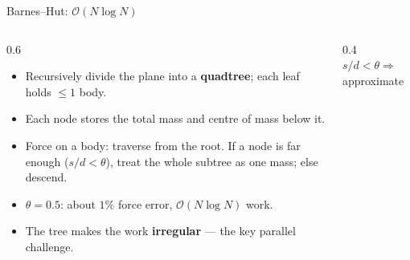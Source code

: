 \documentclass[aspectratio=169]{beamer}
\begin{document}
\begin{frame}{Barnes--Hut: $\mathcal{O}(N\log N)$}
\begin{columns}
\begin{column}{0.6\textwidth}
\begin{itemize}
  \item Recursively divide the plane into a \textbf{quadtree}; each leaf holds
        $\le 1$ body.
  \item Each node stores the total mass and centre of mass below it.
  \item Force on a body: traverse from the root. If a node is far enough
        ($s/d<\theta$), treat the whole subtree as one mass; else descend.
  \item $\theta=0.5$: about $1\%$ force error, $\mathcal{O}(N\log N)$ work.
  \item The tree makes the work \textbf{irregular} --- the key parallel
        challenge.
\end{itemize}
\end{column}
\begin{column}{0.4\textwidth}
\centering
\footnotesize
$s/d < \theta \Rightarrow$ approximate\\[4pt]
\end{column}
\end{columns}
\end{frame}

\end{document}
